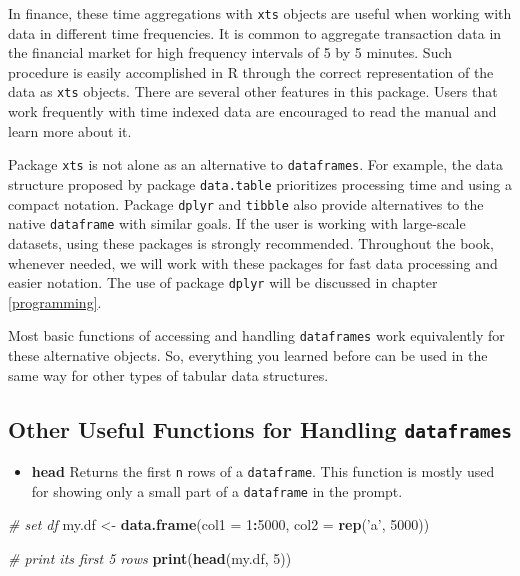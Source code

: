 \documentclass[11pt,]{book}
\newenvironment{Shaded}{\begin{snugshade}}{\end{snugshade}}
\newcommand{\KeywordTok}[1]{\textcolor[rgb]{0.27,0.27,0.27}{\textbf{#1}}}
\newcommand{\DataTypeTok}[1]{\textcolor[rgb]{0.27,0.27,0.27}{#1}}
\newcommand{\DecValTok}[1]{\textcolor[rgb]{0.06,0.06,0.06}{#1}}
\newcommand{\StringTok}[1]{\textcolor[rgb]{0.5,0.5,0.5}{#1}}
\newcommand{\CommentTok}[1]{\textcolor[rgb]{0.56,0.35,0.01}{\textit{#1}}}
\newcommand{\OperatorTok}[1]{\textcolor[rgb]{0.81,0.36,0.00}{\textbf{#1}}}
\newcommand{\NormalTok}[1]{#1}
\providecommand{\tightlist}{%
  \setlength{\itemsep}{0pt}\setlength{\parskip}{0pt}}
\begin{document}
In finance, these time aggregations with \texttt{xts} objects are useful
when working with data in different time frequencies. It is common to
aggregate transaction data in the financial market for high frequency
intervals of 5 by 5 minutes. Such procedure is easily accomplished in R
through the correct representation of the data as \texttt{xts} objects.
There are several other features in this package. Users that work
frequently with time indexed data are encouraged to read the manual and
learn more about it.

Package \texttt{xts} is not alone as an alternative to
\texttt{dataframes}. For example, the data structure proposed by package
\texttt{data.table} \citep{datatable2015} prioritizes processing time
and using a compact notation. Package \texttt{dplyr} \citep{dplyr} and
\texttt{tibble} \citep{tibble} also provide alternatives to the native
\texttt{dataframe} with similar goals. If the user is working with
large-scale datasets, using these packages is strongly recommended.
Throughout the book, whenever needed, we will work with these packages
for fast data processing and easier notation. The use of package
\texttt{dplyr} will be discussed in chapter \ref{programming}.
  

Most basic functions of accessing and handling \texttt{dataframes} work
equivalently for these alternative objects. So, everything you learned
before can be used in the same way for other types of tabular data
structures.

\subsection{\texorpdfstring{Other Useful Functions for Handling
\texttt{dataframes}}{Other Useful Functions for Handling dataframes}}\label{other-useful-functions-for-handling-dataframes}

\begin{itemize}
\tightlist
\item
  \textbf{head} Returns the first \texttt{n} rows of a
  \texttt{dataframe}. This function is mostly used for showing only a
  small part of a \texttt{dataframe} in the prompt. 
\end{itemize}

\begin{Shaded}
\begin{Highlighting}[]
\CommentTok{# set df}
\NormalTok{my.df <-}\StringTok{ }\KeywordTok{data.frame}\NormalTok{(}\DataTypeTok{col1 =} \DecValTok{1}\OperatorTok{:}\DecValTok{5000}\NormalTok{, }\DataTypeTok{col2 =} \KeywordTok{rep}\NormalTok{(}\StringTok{'a'}\NormalTok{, }\DecValTok{5000}\NormalTok{))}

\CommentTok{# print its first 5 rows}
\KeywordTok{print}\NormalTok{(}\KeywordTok{head}\NormalTok{(my.df, }\DecValTok{5}\NormalTok{))}
\end{Highlighting}
\end{Shaded}
\end{document}

